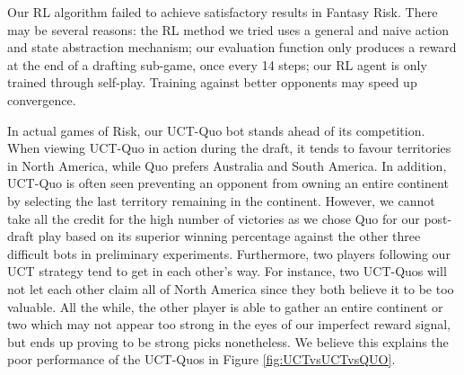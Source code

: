 \documentclass[letterpaper]{article}
\numberwithin{equation}{section}
\numberwithin{theorem}{section}
\numberwithin{lemma}{section}
\numberwithin{df}{section}
\begin{document}
Our RL algorithm failed to achieve satisfactory results in Fantasy Risk. There may be several reasons: the RL method we tried uses a general and naive action and state abstraction mechanism; our evaluation function only produces a reward at the end of a drafting sub-game, once every 14 steps; our RL agent is only trained through self-play. Training against better opponents may speed up convergence.

In actual games of Risk, our UCT-Quo bot stands ahead of its competition.  When viewing UCT-Quo in action during the draft, it tends to favour territories in North America, while Quo prefers Australia and South America.  In addition, UCT-Quo is often seen preventing an opponent from owning an entire continent by selecting the last territory remaining in the continent.  However, we cannot take all the credit for the high number of victories as we chose Quo for our post-draft play based on its superior winning percentage against the other three difficult bots in preliminary experiments.  Furthermore, two players following our UCT strategy tend to get in each other's way.  For instance, two UCT-Quos will not let each other claim all of North America since they both believe it to be too valuable.  All the while, the other player is able to gather an entire continent or two which may not appear too strong in the eyes of our imperfect reward signal, but ends up proving to be strong picks nonetheless.  We believe this explains the poor performance of the UCT-Quos in Figure \ref{fig:UCTvsUCTvsQUO}.
\end{document}
